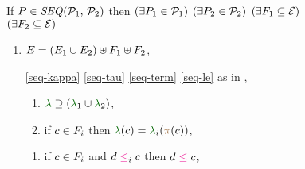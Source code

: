 \begin{figure}
  \renewcommand{\phEvs}{F}
  \raggedright
  
  \noindent
  If $\aPS \in \sSEMI{\aPSS_1}{\aPSS_2}$ then
  $(\exists P_1\in\mathcal{P}_1)$ $(\exists P_2\in\mathcal{P}_2)$
  $(\exists\phEvs_1\subseteq\AllEvents)$ $(\exists\phEvs_2\subseteq\AllEvents)$
  \begin{multicols}{2}
    \begin{enumerate}[topsep=0pt,label=(\textsc{s}\arabic*),ref=\textsc{s}\arabic*]
      \setcounter{enumi}{\value{BE}}
    \item \label{seq-E-phantom}
      $\aEvs=(\aEvs_1\cup\aEvs_2)\uplus\phEvs_1 \uplus\phEvs_2$,

    \item[\eqref{seq-kappa}]
      \eqref{seq-tau}\;
      \eqref{seq-term}\;
      \eqref{seq-le}\;
      as in ,

      \setcounter{enumi}{\value{lambda}}
    \item[] 
      \begin{enumerate}[leftmargin=0pt]
      \item \label{seq-lambda-include}
        ${\labeling}\supseteq\PBR{{\labeling_1}\cup {\labeling_2}}$, 
      \item \label{seq-lambda-phantom}
        if $\cEv\in \phEvs_i$ then $\labeling(\cEv)=\labeling_i(\fmrg{\cEv})$,
      \end{enumerate}


      \setcounter{enumi}{\value{le}}
    \item[] 
      \begin{enumerate}[leftmargin=0pt]
      \item \label{seq-le-phantom}
        if $\cEv\in \phEvs_i$ and $\bEv\le_i\cEv$ then $\bEv\le\cEv$,
      \end{enumerate}


\end{enumerate}
\end{multicols}
\end{figure}
